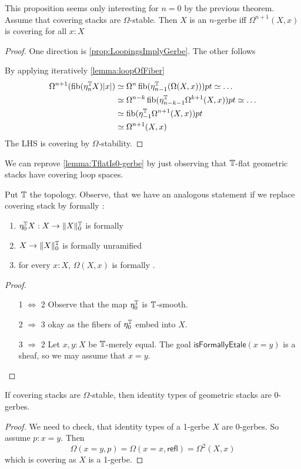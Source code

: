 \documentclass{article}
\newcommand{\refl}{\mathsf{refl}}
\begin{document}
\begin{prop}{\label{prop:GerbeIffLooping}}
	This proposition seems only interesting for $n = 0$ by the previous theorem. Assume that covering stacks are $\Omega$-stable. Then $X$ is an $n$-gerbe iff $\Omega^{n+1}(X,x)$ is covering for all $x: X$	
\end{prop}
\begin{proof}
	One direction is \ref{prop:LoopingsImplyGerbe}. The other follows
	
	By applying iteratively \ref{lemma:loopOfFiber} 
	\begin{align*}
		\Omega^{n+1} (\operatorname{fib} (\eta_n^{\mathbb{T}} X) |x|) &\simeq \Omega^n \operatorname{fib} (\eta_{n-1}^{\mathbb{T}} (\Omega (X,x))) pt \simeq \hdots \\
		&\simeq \Omega^{n-k} \operatorname{fib}(\eta_{n-k-1}^{\mathbb{T}} \Omega^{k+1}(X,x)) pt \simeq \hdots \\
		&\simeq \operatorname{fib} (\eta_{-1}^{\mathbb{T}} \Omega^{n+1} (X,x)) pt \\
		&\simeq \Omega^{n+1} (X , x)
	\end{align*}
	The LHS is covering by $\Omega$-stability.
\end{proof}
We can reprove \ref{lemma:TflatIs0-gerbe} by just observing that $\mathbb{T}$-flat geometric stacks have covering loop spaces. \\

\begin{rmk}
	Put $\mathbb{T}$ the \etale topology. Observe, that we have an analogous statement if we replace covering stack by formally \etale: \\
	\begin{enumerate}
		\item $\eta_0^{\mathbb{T}} X : X \to \|X\|_0^{\mathbb{T}}$ is formally \etale
		\item $X \to \|X\|_0^{\mathbb{T}}$ is formally unramified
		\item for every $x : X$, $\Omega(X,x)$ is formally \etale.
	\end{enumerate}
\end{rmk}
\begin{proof}
	\begin{enumerate}
		\item[ 1 $\Leftrightarrow$ 2] Observe that the map $\eta_0^{\mathbb{T}}$ is $\mathbb{T}$-smooth.
		\item [2 $\Rightarrow$ 3] okay as the fibers of $\eta_0^{\mathbb{T}}$ embed into $X$.
		\item [3 $\Rightarrow$ 2] Let $x, y : X$ be $\mathbb{T}$-merely equal. The goal $\mathsf{isFormallyEtale}(x = y)$ is a sheaf, so we may assume that $x = y$. 
	\end{enumerate}
\end{proof}
\begin{corollary}
	If covering stacks are $\Omega$-stable, then identity types of geometric stacks are 0-gerbes.
\end{corollary}
\begin{proof}
	We need to check, that identity types of a 1-gerbe $X$ are 0-gerbes. So assume $p : x = y$. Then 
	\[
	\Omega(x = y, p) = \Omega(x = x, \refl) = \Omega^2(X,x)
	\]
	which is covering as $X$ is a 1-gerbe.
\end{proof}
\end{document}
